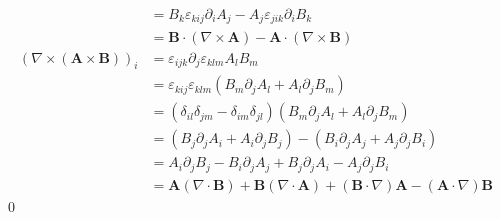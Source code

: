 \documentclass[uplatex,dvipdfmx,a4paper,11pt]{jlreq}
\makeatletter
\renewcommand{\div}{\nabla\cdot}
\newcommand{\rot}{\nabla\times}
\theoremstyle{definition}
\renewenvironment{proof}[1][\proofname]{\par
  \normalfont
  \topsep6\p@\@plus6\p@ \trivlist
  \item[\hskip\labelsep{\bfseries #1}\@addpunct{\bfseries}]\ignorespaces\quad\par
}{%
  \qed\endtrivlist\@endpefalse
}
\renewcommand\proofname{証明}
\makeatother
\begin{document}
\begin{proof}
\begin{align}
                                   & = B_k\varepsilon_{kij}\partial_iA_j - A_j\varepsilon_{jik}\partial_iB_k                                                                         \\
                                   & = \bm{B}\cdot(\rot{\bm{A}}) - \bm{A}\cdot(\rot{\bm{B}})                                                                                         \\
    (\rot{(\bm{A}\times\bm{B})})_i & = \varepsilon_{ijk}\partial_j\varepsilon_{klm}A_lB_m                                                                                            \\
                                   & = \varepsilon_{kij}\varepsilon_{klm}(B_m\partial_jA_l + A_l\partial_jB_m)                                                                       \\
                                   & = (\delta_{il}\delta_{jm} - \delta_{im}\delta_{jl})(B_m\partial_jA_l + A_l\partial_jB_m)                                                        \\
                                   & = (B_j\partial_jA_i + A_i\partial_jB_j) - (B_i\partial_jA_j + A_j\partial_jB_i)                                                                 \\
                                   & = A_i\partial_jB_j - B_i\partial_jA_j + B_j\partial_jA_i - A_j\partial_jB_i                                                                     \\
                                   & = \bm{A}(\div{\bm{B}}) + \bm{B}(\div{\bm{A}}) + (\bm{B}\cdot\nabla)\bm{A} - (\bm{A}\cdot\nabla)\bm{B}
  \end{align}
\end{proof}
\end{document}
